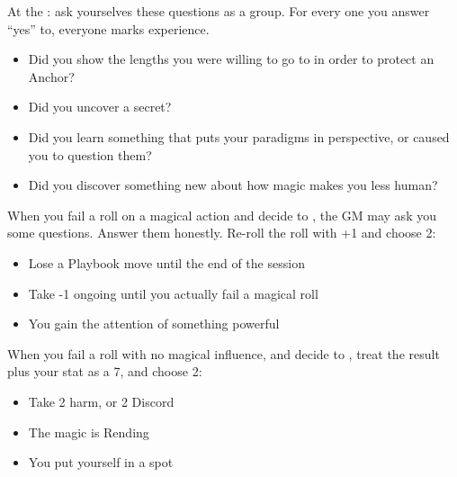 \begin{multicols}{3}
  \columnbreak

  \begin{move}
    At the : ask yourselves these questions as
    a group. For every one you answer ``yes'' to, everyone marks
    experience.
    \begin{itemize}
      \setlength\itemsep{0em}
    \item Did you show the lengths you were willing to go to in order
      to protect an Anchor?
    \item Did you uncover a secret?
    \item Did you learn something that puts your paradigms in
      perspective, or caused you to question them?
    \item Did you discover something new about how magic makes you
      less human?
    \end{itemize}
  \end{move}

  \SEPARATOR
  
  \begin{move}
    When you fail a roll on a magical action and decide to , the GM may ask you some
    questions. Answer them honestly. Re-roll the roll with +1 and choose
    2:
    \begin{itemize}
      \setlength\itemsep{0em}
    \item Lose a Playbook move until the end of the session
    \item Take -1 ongoing until you actually fail a magical roll
    \item You gain the attention of something powerful
    \end{itemize}
  \end{move}

  \SEPARATOR
  
  \begin{move}
    When you fail a roll with no magical influence, and decide to
    , treat the result plus your stat as a
    7, and choose 2:
    \begin{itemize}
      \setlength\itemsep{0em}
    \item Take 2 harm, or 2 Discord
    \item The magic is Rending
    \item You put yourself in a spot
    \end{itemize}
  \end{move}

\end{multicols}

